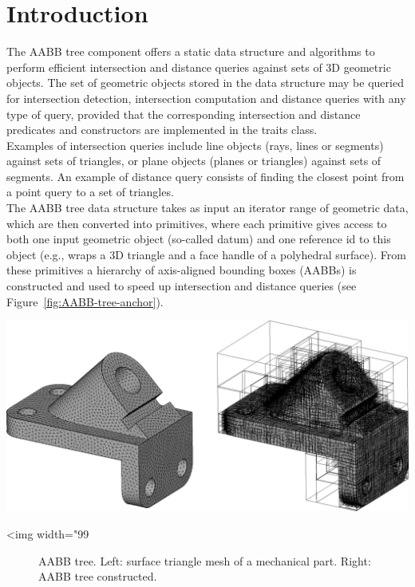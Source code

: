 \section{Introduction}
\label{AABB_tree_section_intro}

The AABB tree component offers a static data structure and algorithms to perform efficient intersection and distance queries against sets of 3D geometric objects.
The set of geometric objects stored in the data structure may be queried for intersection detection, intersection computation and distance queries with any type of query, provided that the corresponding intersection and distance predicates and constructors are implemented in the traits class.\\

Examples of intersection queries include line objects (rays, lines or segments) against sets of triangles, or plane objects (planes or triangles) against sets of segments. An example of distance query consists of finding the closest point from a point query to a set of triangles.\\

The AABB tree data structure takes as input an iterator range of geometric data, which are then converted into primitives, where each primitive gives access to both one input geometric object (so-called datum) and one reference id to this object (e.g., wraps a 3D triangle and a face handle of a polyhedral surface). From these primitives a hierarchy of axis-aligned bounding boxes (AABBs) is constructed and used to speed up intersection and distance queries (see Figure~\ref{fig:AABB-tree-anchor}). 

\begin{center}
    \label{fig:AABB-tree-anchor}
    \begin{ccTexOnly}
      \includegraphics[width=1.0\textwidth]{AABB_tree/anchor}
    \end{ccTexOnly}
    \begin{ccHtmlOnly}
        <img width="99%
    \end{ccHtmlOnly}
    \begin{figure}[h]
        \caption{AABB tree.
                 Left: surface triangle mesh of a mechanical part.
                 Right: AABB tree constructed.}
    \end{figure}
\end{center}
